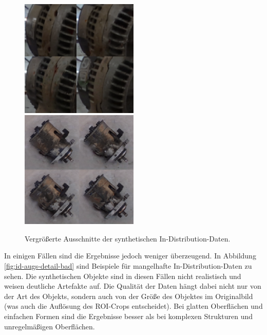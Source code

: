 \begin{figure}[h]
	\centering
	\includegraphics[width=0.5\textwidth]{figure_results_id-augs_detail_1.png}%
	\includegraphics[width=0.5\textwidth]{figure_results_id-augs_detail_2.png}
	\caption{Vergrößerte Ausschnitte der synthetischen In-Distribution-Daten.}
	\label{fig:id-augs-detail-good}
\end{figure}

In einigen Fällen sind die Ergebnisse jedoch weniger überzeugend. In Abbildung \ref{fig:id-augs-detail-bad} sind Beispiele für mangelhafte In-Distribution-Daten zu sehen. Die synthetischen Objekte sind in diesen Fällen nicht realistisch und weisen deutliche Artefakte auf. Die Qualität der Daten hängt dabei nicht nur von der Art des Objekts, sondern auch von der Größe des Objektes im Originalbild (was auch die Auflösung des ROI-Crops entscheidet). Bei glatten Oberflächen und einfachen Formen sind die Ergebnisse besser als bei komplexen Strukturen und unregelmäßigen Oberflächen.

